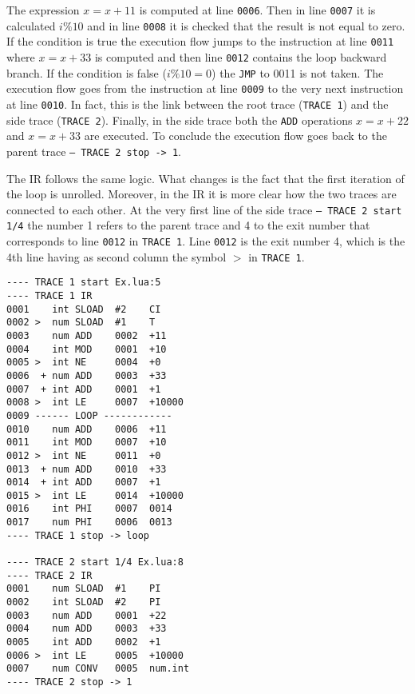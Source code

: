 \noindent
The expression $x=x+11$ is computed at line \texttt{0006}. Then in line \texttt{0007} it is calculated $i\%10$ and in line \texttt{0008} it is checked that the result is not equal to zero. If the condition is true the execution flow jumps to the instruction at line \texttt{0011} where $x=x+33$ is computed and then line \texttt{0012} contains the loop backward branch. If the condition is false ($i\%10 = 0$) the \texttt{JMP} to 0011 is not taken. The execution flow goes from the instruction at line \texttt{0009} to the very next instruction at line \texttt{0010}. In fact, this is the link between the root trace (\texttt{TRACE 1}) and the side trace (\texttt{TRACE 2}). Finally, in the side trace both the \texttt{ADD} operations $x=x+22$ and $x=x+33$ are executed. To conclude the execution flow goes back to the parent trace \texttt{-- TRACE 2 stop -> 1}.

The IR follows the same logic. What changes is the fact that the first iteration of the loop is unrolled. Moreover, in the IR it is more clear how the two traces are connected to each other. At the very first line of the side trace \texttt{-- TRACE 2 start 1/4} the number 1 refers to the parent trace and 4 to the exit number that corresponds to line \texttt{0012} in \texttt{TRACE 1}. Line \texttt{0012} is the exit number 4, which is the 4th line having as second column the symbol $>$ in \texttt{TRACE 1}.

\begin{multicols}{2}
\begin{lstlisting}[style=DumpStyle]
---- TRACE 1 start Ex.lua:5
---- TRACE 1 IR
0001    int SLOAD  #2    CI
0002 >  num SLOAD  #1    T
0003    num ADD    0002  +11 
0004    int MOD    0001  +10 
0005 >  int NE     0004  +0  
0006  + num ADD    0003  +33 
0007  + int ADD    0001  +1  
0008 >  int LE     0007  +10000
0009 ------ LOOP ------------
0010    num ADD    0006  +11 
0011    int MOD    0007  +10 
0012 >  int NE     0011  +0  
0013  + num ADD    0010  +33 
0014  + int ADD    0007  +1  
0015 >  int LE     0014  +10000
0016    int PHI    0007  0014
0017    num PHI    0006  0013
---- TRACE 1 stop -> loop

---- TRACE 2 start 1/4 Ex.lua:8
---- TRACE 2 IR
0001    num SLOAD  #1    PI
0002    int SLOAD  #2    PI
0003    num ADD    0001  +22 
0004    num ADD    0003  +33 
0005    int ADD    0002  +1  
0006 >  int LE     0005  +10000
0007    num CONV   0005  num.int
---- TRACE 2 stop -> 1
\end{lstlisting}
\end{multicols}

